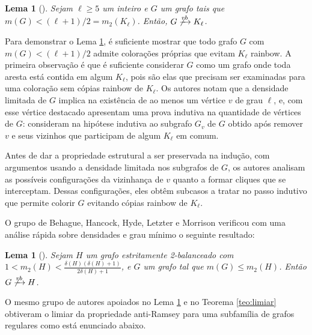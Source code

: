 \documentclass[12pt,a4paper]{book}
\newtheorem{lema}      [teorema] {Lema}
\begin{document}
   \begin{lema}[\cite{kohayakawa2019anti}]\label{lema:rbcomplete}
         Sejam $\ell \geq 5$ um inteiro e $G$ um grafo tais que 
         $m(G) < (\ell+1)/2 = m_2(K_\ell)$.
         Então, $G \not\xrightarrow[]{rb} K_\ell$.
    \end{lema}
    
    Para demonstrar o Lema \ref{lema:rbcomplete}, é suficiente mostrar que todo grafo $G$ com $m(G) < (\ell+1)/2$  admite colorações próprias que evitam $K_\ell$ rainbow. 
    A primeira observação é que é suficiente considerar $G$ como um grafo onde toda aresta está contida em algum $K_\ell$, pois são elas que precisam ser examinadas para uma coloração sem cópias rainbow de $K_\ell$. 
    Os autores notam que a densidade limitada de $G$ implica na existência de ao menos um vértice $v$ de grau $\ell$, e, com esse vértice destacado apresentam uma prova indutiva na quantidade de vértices de $G$: consideram na hipótese indutiva ao subgrafo $G_v$ de $G$ obtido após remover $v$ e seus vizinhos que participam de algum $K_\ell$ em comum.
    
    Antes de dar a propriedade estrutural a ser preservada na indução, com argumentos usando a densidade limitada nos subgrafos de $G$, os autores analisam as possíveis configurações da vizinhança de $v$ quanto a formar cliques que se interceptam. 
    Dessas configurações, eles obtêm subcasos a tratar no passo indutivo que permite colorir $G$ evitando cópias rainbow de $K_\ell$.

O grupo de Behague, Hancock, Hyde, Letzter e Morrison \cite{behague2024thresholds} verificou com uma análise rápida sobre densidades e grau mínimo o seguinte resultado:

 \begin{lema}[\cite{behague2024thresholds}]\label{lema:rbgrau}
    Sejam $H$ um grafo estritamente 2-balanceado com $1< m_2(H) < \frac{\delta(H)(\delta(H)+1)}{2\delta(H)+1}$, e $G$ um grafo tal que $m(G) \leq m_2(H)$.
    Então $G \not\xrightarrow[]{rb} H$.
\end{lema}

O mesmo grupo de autores apoiados no Lema \ref{lema:rbgrau} e no Teorema \ref{teo:limiar} obtiveram o limiar da propriedade anti-Ramsey para uma subfamília de grafos regulares como está enunciado abaixo.
\end{document}
